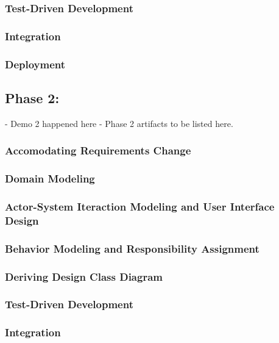 \documentclass[11pt]{article}
\begin{document}
\subsubsection{Test-Driven Development}
 
\subsubsection{Integration}
 
\subsubsection{Deployment}
\subsection{Phase 2:} 
 - Demo 2 happened here
 - Phase 2 artifacts to be listed here.

\subsubsection{Accomodating Requirements Change}
 
\subsubsection{Domain Modeling}
  
\subsubsection{Actor-System Iteraction Modeling and User Interface Design}
  
\subsubsection{Behavior Modeling and Responsibility Assignment}
  
\subsubsection{Deriving Design Class Diagram}
  
\subsubsection{Test-Driven Development}
  
\subsubsection{Integration}
  
\end{document}
